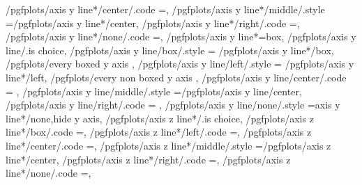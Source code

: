 {	/pgfplots/axis y line*/center/.code	={\def\pgfplots@yaxislinesnum{2}\def\pgfplots@ytickposnum{2}\let\pgfplots@yticklabel@pos\pgfutil@empty},
	/pgfplots/axis y line*/middle/.style	={/pgfplots/axis y line*/center},
	/pgfplots/axis y line*/right/.code	={\def\pgfplots@yaxislinesnum{3}\def\pgfplots@ytickposnum{3}\let\pgfplots@yticklabel@pos\pgfutil@empty},
	/pgfplots/axis y line*/none/.code	={\def\pgfplots@yaxislinesnum{4}\def\pgfplots@ytickposnum{4}\let\pgfplots@yticklabel@pos\pgfutil@empty},
	/pgfplots/axis y line*=box,
	/pgfplots/axis y line/.is choice,
	/pgfplots/axis y line/box/.style	={
		/pgfplots/axis y line*/box,
		/pgfplots/every boxed y axis
	},
	/pgfplots/axis y line/left/.style	={
		/pgfplots/axis y line*/left,
		/pgfplots/every non boxed y axis
	},
	/pgfplots/axis y line/center/.code	={
		\ifnum{} %
		\else
		\fi
	},
	/pgfplots/axis y line/middle/.style	={/pgfplots/axis y line/center},
	/pgfplots/axis y line/right/.code	={%
		\ifnum{}
		\fi
	},%
	/pgfplots/axis y line/none/.style	={axis y line*/none,hide y axis},
%
	/pgfplots/axis z line*/.is choice,
	/pgfplots/axis z line*/box/.code	={\def\pgfplots@zaxislinesnum{0}\def\pgfplots@ztickposnum{0}},
	/pgfplots/axis z line*/left/.code	={\def\pgfplots@zaxislinesnum{1}\def\pgfplots@ztickposnum{1}\let\pgfplots@zticklabel@pos\pgfutil@empty},
	/pgfplots/axis z line*/center/.code	={\def\pgfplots@zaxislinesnum{2}\def\pgfplots@ztickposnum{2}\let\pgfplots@zticklabel@pos\pgfutil@empty},
	/pgfplots/axis z line*/middle/.style	={/pgfplots/axis z line*/center},
	/pgfplots/axis z line*/right/.code	={\def\pgfplots@zaxislinesnum{3}\def\pgfplots@ztickposnum{3}\let\pgfplots@zticklabel@pos\pgfutil@empty},
	/pgfplots/axis z line*/none/.code	={\def\pgfplots@zaxislinesnum{4}\def\pgfplots@ztickposnum{4}\let\pgfplots@zticklabel@pos\pgfutil@empty},
}
